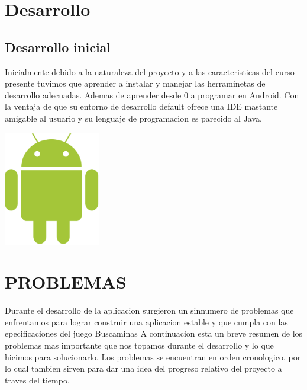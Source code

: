 \documentclass[11pt]{article} %
\begin{document}
\section{Desarrollo}
\subsection{Desarrollo inicial}
Inicialmente debido  a la naturaleza del proyecto y a las caracteristicas del curso presente tuvimos que aprender a instalar y manejar las herraminetas de desarrollo adecuadas. Ademas de aprender desde 0 a programar en Android. Con la ventaja de que su entorno de desarrollo default ofrece una IDE mastante amigable al usuario y su lenguaje de programacion es parecido al Java. 

\includegraphics[height=5cm]{imagenes/Android_robot.png}
\section{PROBLEMAS }

Durante el desarrollo de la aplicacion surgieron un sinnumero de problemas que enfrentamos para lograr construir una aplicacion estable y que cumpla con las epecificaciones del juego Buscaminas
A continuacion esta un breve resumen de los problemas mas importante que nos topamos durante el desarrollo  y lo que hicimos para solucionarlo.
Los problemas se encuentran en orden cronologico, por lo cual tambien sirven para dar una idea del progreso relativo del proyecto a traves del tiempo.
\end{document}

